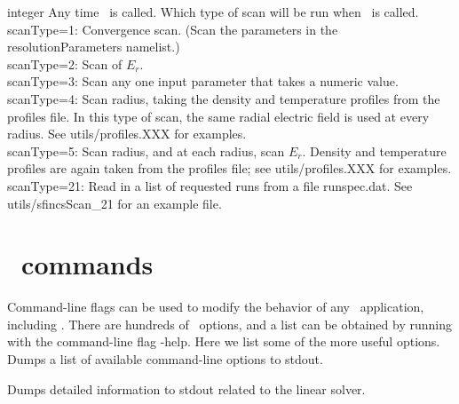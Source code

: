 {integer}
{Any time \sfincsScan~is called.}
{Which type of scan will be run when \sfincsScan~is called. \\

{\ttfamily scanType=1}:  Convergence scan. (Scan the parameters in the resolutionParameters namelist.)\\

{\ttfamily scanType=2}:  Scan of $E_r$.\\

{\ttfamily scanType=3}:  Scan any one input parameter that takes a numeric value.\\

{\ttfamily scanType=4}:  Scan radius, taking the density and temperature profiles from the {\ttfamily profiles} file.
In this type of scan, the same radial electric field is used at every radius.
See {\ttfamily utils/profiles.XXX} for examples.\\

{\ttfamily scanType=5}:  Scan radius, and at each radius, scan $E_r$.  Density and temperature profiles are again
 taken from the {\ttfamily profiles} file; see {\ttfamily utils/profiles.XXX} for examples.\\

{\ttfamily scanType=21}: Read in a list of requested runs from a file {\ttfamily runspec.dat}. See {\ttfamily utils/sfincsScan\_21} for an example file.
}

\myhrule


\section{\PETSc~commands}

Command-line flags can be used to modify the behavior of any \PETSc~application, including \sfincs.
There are hundreds of \PETSc~options, and a list can be obtained by running with the command-line flag
{\ttfamily -help}. Here we list some of the more useful options.\\

{Dumps a list of available command-line options to stdout.}

\myhrule

{Dumps detailed information to stdout related to the linear solver.}



